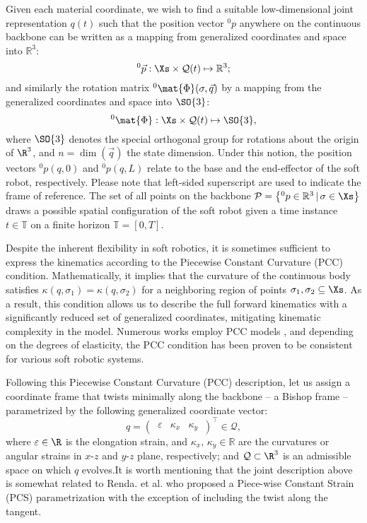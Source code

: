 {Given each material coordinate, we wish to find a suitable low-dimensional joint representation $q(t)$ such that the position vector $^0p$ anywhere on the continuous backbone can be written as a mapping from generalized coordinates and space into $\mathbb{R}^3$:
%
\begin{equation}
^0\vec{p}:  \Xs \times \mathcal{Q}(t) \mapsto \mathbb{R}^3;
\end{equation}
%
and similarly the rotation matrix $^0\mat{\Phi}(\sigma,\vec{q})$ by a mapping from the generalized coordinates and space into $\SO{3}$:
%
\begin{equation}
^0\mat{\Phi}: \Xs \times \mathcal{Q}(t) \mapsto \SO{3}, \label{eq:phi_map}
\end{equation}
%
where {$\SO{3}$ denotes the special orthogonal group for rotations about the origin of $\R^3$}, and $n = \dim(\vec{q})$ the state dimension. Under this notion, the position vectors $^0p(q,0)$ and {$^0p(q,L)$} relate to the base and the end-effector of the soft robot, respectively. {Please note that left-sided superscript are used to indicate the frame of reference.} The set of all points on the backbone $\mathcal{P} = \left\{^0p \in \mathbb{R}^3\, |\, \sigma \in \Xs \right\}$ draws a possible {spatial} configuration of the soft robot given {a time instance $t \in \mathbb{T}$ on a finite horizon $\mathbb{T} = [0,T]$}.
%
\begin{intermezzo}
Despite the inherent flexibility in soft robotics, it is sometimes sufficient to express the kinematics according to the Piecewise Constant Curvature (PCC) condition. Mathematically, it implies that the curvature of the continuous body satisfies $\kappa(q,\sigma_1) = \kappa(q,\sigma_2)$ for a neighboring region of points $\sigma_1,\sigma_2 \subseteq \Xs$. As a result, this condition allows us to describe the full forward kinematics with a significantly reduced set of generalized coordinates, mitigating kinematic complexity in the model. Numerous works employ PCC models \cite{Falkenhahn2015,Katzschmann2019,Tatlicioglu2007,Marchese2016,Godage2016,Santina2020Pcc}, and depending on the degrees of elasticity, the PCC condition has been proven to be consistent for various soft robotic systems.
\end{intermezzo}
%
{Following this Piecewise Constant Curvature (PCC) description, let us assign a coordinate frame that twists minimally along the backbone -- a Bishop frame \cite{Bishop1975}-- parametrized by the following generalized coordinate vector:}
%
\begin{equation}
q = \begin{pmatrix}
\,\varepsilon & \kappa_x & \kappa_y\,
\end{pmatrix}^\top \in \mathcal{Q},
\label{eq:coordinate}
\end{equation}
%
\noindent where {$\varepsilon \in \R$ is the elongation strain}, and $\kappa_x,\,\kappa_y\in\mathbb{R}$ are the curvatures or angular strains in $x$-$z$ and $y$-$z$ plane, respectively; and $\mathcal{Q} \subset \R^3$ is an admissible space on which $q$ evolves.It is worth mentioning that the joint description above is somewhat related to Renda. et al. \cite{Renda2018} who proposed a Piece-wise Constant Strain (PCS) parametrization with the exception of including the twist along the tangent.

}
